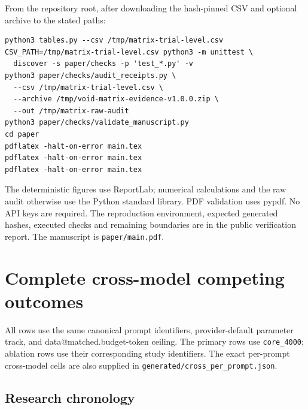 \documentclass[11pt]{article}
\makeatletter
\newcommand{\RaggedTableColumns}{\let\SavedArrayRestore\@arrayparboxrestore\def\@arrayparboxrestore{\SavedArrayRestore\RaggedRight\arraybackslash}}
\newcommand{\D}[1]{\csname data@#1\endcsname}
\makeatother
\begin{document}
From the repository root, after downloading the hash-pinned CSV and optional archive to the stated paths:
\begin{verbatim}
python3 tables.py --csv /tmp/matrix-trial-level.csv
CSV_PATH=/tmp/matrix-trial-level.csv python3 -m unittest \
  discover -s paper/checks -p 'test_*.py' -v
python3 paper/checks/audit_receipts.py \
  --csv /tmp/matrix-trial-level.csv \
  --archive /tmp/void-matrix-evidence-v1.0.0.zip \
  --out /tmp/matrix-raw-audit
python3 paper/checks/validate_manuscript.py
cd paper
pdflatex -halt-on-error main.tex
pdflatex -halt-on-error main.tex
pdflatex -halt-on-error main.tex
\end{verbatim}
The deterministic figures use ReportLab; numerical calculations and the raw audit otherwise use the Python standard library. PDF validation uses pypdf. No API keys are required. The reproduction environment, expected generated hashes, executed checks and remaining boundaries are in the public verification report. The manuscript is \texttt{paper/main.pdf}.

\clearpage
\section{Complete cross-model competing outcomes}\label{app:cross}
All rows use the same canonical prompt identifiers, provider-default parameter track, and \D{matched.budget}-token ceiling. The primary rows use \texttt{core\_4000}; ablation rows use their corresponding study identifiers. The exact per-prompt cross-model cells are also supplied in \texttt{generated/cross\_per\_prompt.json}.

\begin{table}[H]
\centering\small

\caption{Complete V0/NV/R accounting for the cross-model comparison. No other outcome class occurs in these selected cells.}
\end{table}
\clearpage
\begin{landscape}
\section{Research chronology}\label{app:chronology}
{\small\setlength{\tabcolsep}{3pt}\RaggedTableColumns}
\end{landscape}
\end{document}
